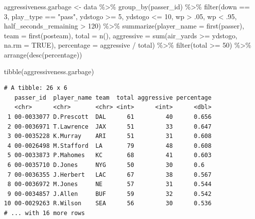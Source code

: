 \documentclass[
  letterpaper,
]{krantz}
\newenvironment{Shaded}{\begin{snugshade}}{\end{snugshade}}
\newcommand{\AttributeTok}[1]{\textcolor[rgb]{0.40,0.45,0.13}{#1}}
\newcommand{\ConstantTok}[1]{\textcolor[rgb]{0.56,0.35,0.01}{#1}}
\newcommand{\DecValTok}[1]{\textcolor[rgb]{0.68,0.00,0.00}{#1}}
\newcommand{\FunctionTok}[1]{\textcolor[rgb]{0.28,0.35,0.67}{#1}}
\newcommand{\NormalTok}[1]{\textcolor[rgb]{0.00,0.23,0.31}{#1}}
\newcommand{\OtherTok}[1]{\textcolor[rgb]{0.00,0.23,0.31}{#1}}
\newcommand{\SpecialCharTok}[1]{\textcolor[rgb]{0.37,0.37,0.37}{#1}}
\newcommand{\StringTok}[1]{\textcolor[rgb]{0.13,0.47,0.30}{#1}}
\begin{document}
\begin{Shaded}
\begin{Highlighting}[]
\NormalTok{aggressiveness.garbage }\OtherTok{\textless{}{-}}\NormalTok{ data }\SpecialCharTok{\%\textgreater{}\%}
  \FunctionTok{group\_by}\NormalTok{(passer\_id) }\SpecialCharTok{\%\textgreater{}\%}
  \FunctionTok{filter}\NormalTok{(down }\SpecialCharTok{==} \DecValTok{3}\NormalTok{, play\_type }\SpecialCharTok{==} \StringTok{"pass"}\NormalTok{, ydstogo }\SpecialCharTok{\textgreater{}=} \DecValTok{5}\NormalTok{, ydstogo }\SpecialCharTok{\textless{}=} \DecValTok{10}\NormalTok{,}
\NormalTok{         wp }\SpecialCharTok{\textgreater{}}\NormalTok{ .}\DecValTok{05}\NormalTok{, wp }\SpecialCharTok{\textless{}}\NormalTok{ .}\DecValTok{95}\NormalTok{, half\_seconds\_remaining }\SpecialCharTok{\textgreater{}} \DecValTok{120}\NormalTok{) }\SpecialCharTok{\%\textgreater{}\%}
  \FunctionTok{summarize}\NormalTok{(}\AttributeTok{player\_name =} \FunctionTok{first}\NormalTok{(passer),}
            \AttributeTok{team =} \FunctionTok{first}\NormalTok{(posteam),}
            \AttributeTok{total =} \FunctionTok{n}\NormalTok{(),}
            \AttributeTok{aggressive =} \FunctionTok{sum}\NormalTok{(air\_yards }\SpecialCharTok{\textgreater{}=}\NormalTok{ ydstogo, }\AttributeTok{na.rm =} \ConstantTok{TRUE}\NormalTok{),}
            \AttributeTok{percentage =}\NormalTok{ aggressive }\SpecialCharTok{/}\NormalTok{ total) }\SpecialCharTok{\%\textgreater{}\%}
  \FunctionTok{filter}\NormalTok{(total }\SpecialCharTok{\textgreater{}=} \DecValTok{50}\NormalTok{) }\SpecialCharTok{\%\textgreater{}\%}
  \FunctionTok{arrange}\NormalTok{(}\FunctionTok{desc}\NormalTok{(percentage))}

\FunctionTok{tibble}\NormalTok{(aggressiveness.garbage)}
\end{Highlighting}
\end{Shaded}

\begin{verbatim}
# A tibble: 26 x 6
   passer_id  player_name team  total aggressive percentage
   <chr>      <chr>       <chr> <int>      <int>      <dbl>
 1 00-0033077 D.Prescott  DAL      61         40      0.656
 2 00-0036971 T.Lawrence  JAX      51         33      0.647
 3 00-0035228 K.Murray    ARI      51         31      0.608
 4 00-0026498 M.Stafford  LA       79         48      0.608
 5 00-0033873 P.Mahomes   KC       68         41      0.603
 6 00-0035710 D.Jones     NYG      50         30      0.6  
 7 00-0036355 J.Herbert   LAC      67         38      0.567
 8 00-0036972 M.Jones     NE       57         31      0.544
 9 00-0034857 J.Allen     BUF      59         32      0.542
10 00-0029263 R.Wilson    SEA      56         30      0.536
# ... with 16 more rows
\end{verbatim}
\end{document}
